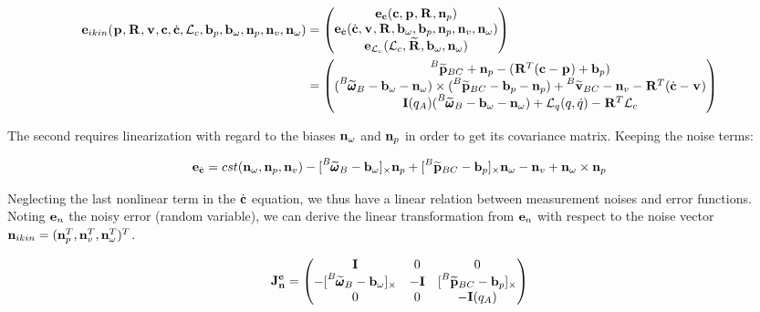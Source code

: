\documentclass[11pt]{article}
\newcommand{\Rot}[2]{\prescript{#1}{}{\bfR}_{#2}}
\newcommand{\Rotm}[2]{\prescript{#1}{}{\widetilde{\bfR}}_{#2}}
\newcommand{\noise}{\bfn}
\newcommand{\bias}{\bfb}
\newcommand{\posi}[2]{\prescript{#1}{}{\bfp}_{#2}}
\newcommand{\posim}[2]{\prescript{#1}{}{\widetilde{\bfp}}_{#2}}
\newcommand{\vel}[2]{\prescript{#1}{}{\bfv}_{#2}}
\newcommand{\velm}[2]{\prescript{#1}{}{\widetilde{\bfv}}_{#2}}
\newcommand{\angvelm}[2]{\prescript{#1}{}{\widetilde{\pmb{\omega}}}_{#2}}
\newcommand{\AM}{\mathcal{L}}
\newcommand{\COM}{\bfc}
\newcommand{\COMd}{\dot{\bfc}}
\newcommand{\Ident}{\bfI}
\begin{document}
\begin{equation}
\begin{split}
\bfe_{ikin}(\posi{}{}, \Rot{}{}, \vel{}{}, \COM, \COMd, \AM_c, \bias_p, \bias_{\omega}, \noise_p, \noise_v, \noise_{\omega}) &= 
\begin{pmatrix}
\bfe_{\COM}(\COM, \posi{}{}, \Rot{}{}, \noise_p)
\\
\bfe_{\COMd}(\COMd, \vel{}{}, \Rot{}{}, \bias_{\omega}, \bias_p, \noise_p, \noise_v, \noise_{\omega})
\\
\bfe_{\AM_c}(\AM_c, \Rotm{}{}, \bias_{\omega}, \noise_{\omega})
\end{pmatrix}
\\
&=
\begin{pmatrix}
\posim{B}{BC} + \noise_p - (\Rot{}{}^T(\COM - \posi{}{}) + \bias_{p})
\\
(\angvelm{B}{B} - \bias_{\omega} - \noise_{\omega}) \times (\posim{B}{BC} -  \bias_{p} - \noise_p) + \velm{B}{BC} - \noise_v - \Rot{}{}^T(\COMd - \vel{}{})
\\
\bfI(q_A) (\angvelm{B}{B} - \bias_{\omega} - \noise_{\omega}) + \AM_q (q,\dot{q}) - \Rot{}{}^T\AM_c
\end{pmatrix}
\end{split}
\end{equation}

The second requires linearization with regard to the biases $\noise_{\omega}$ and $\noise_{p}$ in order to get its covariance matrix. Keeping the noise terms:

\begin{equation}
    \bfe_{\COMd} = cst(\noise_{\omega}, \noise_{p}, \noise_{v}) - [\angvelm{B}{B} - \bias_{\omega}]_{\times}\noise_p + [\posim{B}{BC} -  \bias_{p}]_{\times}\noise_{\omega} - \noise_v + \noise_{\omega}\times\noise_p
\end{equation}

Neglecting the last nonlinear term in the $\COMd$ equation, we thus have a linear relation between measurement noises and error functions. 
Noting ${\bf e}_n$ the noisy error (random variable), we can derive the linear transformation from ${\bf e}_n$ with respect to the noise vector $\noise_{ikin} = (\noise_p^T, \noise_v^T, \noise_{\omega}^T)^T$.

\begin{equation}
\bfJ^{\bfe}_{\noise} = 
\begin{pmatrix}
\Ident & 0 & 0 
\\
- [\angvelm{B}{B} - \bias_{\omega}]_{\times} & -\Ident & [\posim{B}{BC} -  \bias_{p}]_{\times}
\\
0 & 0 & -\bfI(q_A)
\end{pmatrix}
\end{equation}
\end{document}

